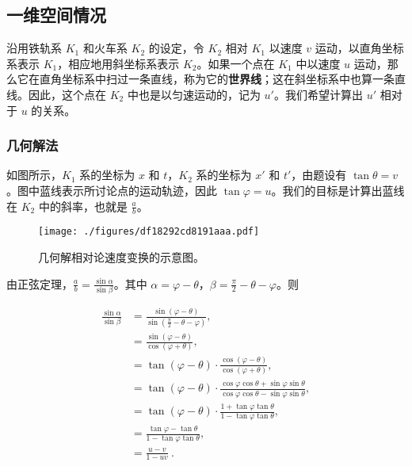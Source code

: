
\subsection{一维空间情况}

沿用铁轨系 $K_1$ 和火车系 $K_2$ 的设定，令 $K_2$ 相对 $K_1$ 以速度 $v$ 运动，以直角坐标系表示 $K_1$，相应地用斜坐标系表示 $K_2$。如果一个点在 $K_1$ 中以速度 $u$ 运动，那么它在直角坐标系中扫过一条直线，称为它的\textbf{世界线}；这在斜坐标系中也算一条直线。因此，这个点在 $K_2$ 中也是以匀速运动的，记为 $u'$。我们希望计算出 $u'$ 相对于 $u$ 的关系。


\subsubsection{几何解法}

如图所示，$K_1$ 系的坐标为 $x$ 和 $t$，$K_2$ 系的坐标为 $x'$ 和 $t'$，由题设有 $\tan{\theta}=v$。图中蓝线表示所讨论点的运动轨迹，因此 $\tan{\varphi}=u$。我们的目标是计算出蓝线在 $K_2$ 中的斜率，也就是 $\frac{a}{b}$。


\begin{figure}[ht]
\centering
\texttt{[image: ./figures/df18292cd8191aaa.pdf]}
\caption{几何解相对论速度变换的示意图。} \label{fig_RelVel_1}
\end{figure}

由正弦定理，$\frac{a}{b}=\frac{\sin{\alpha}}{\sin{\beta}}$。其中 $\alpha=\varphi-\theta$，$\beta=\frac{\pi}{2}-\theta-\varphi$。则

\begin{equation}\label{eq_RelVel_1}
\begin{aligned}
\frac{\sin{\alpha}}{\sin{\beta}}&=\frac{\sin{(\varphi-\theta)}}{\sin{(\frac{\pi}{2}-\theta-\varphi)}},\\ 
&=\frac{\sin{(\varphi-\theta)}}{\cos{(\varphi+\theta)}},\\ 
&=\tan(\varphi-\theta)\cdot\frac{\cos(\varphi-\theta)}{\cos(\varphi+\theta)},\\ 
&=\tan(\varphi-\theta)\cdot\frac{\cos\varphi\cos\theta+\sin\varphi\sin\theta}{\cos\varphi\cos\theta-\sin\varphi\sin\theta},\\ 
&=\tan(\varphi-\theta)\cdot\frac{1+\tan\varphi\tan\theta}{1-\tan\varphi\tan\theta},\\ 
&=\frac{\tan\varphi-\tan\theta}{1-\tan\varphi\tan\theta},\\ 
&=\frac{u-v}{1-uv}~.
\end{aligned}
\end{equation}

